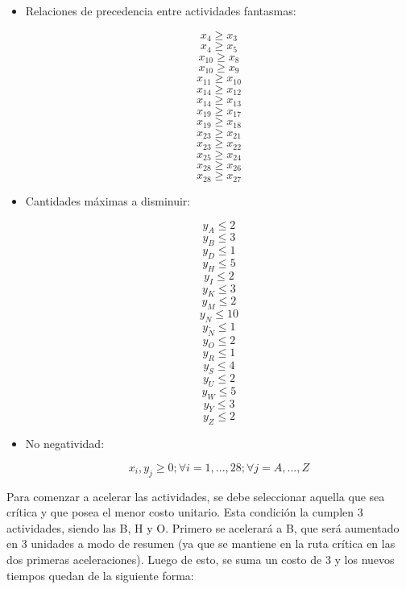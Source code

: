 \documentclass[]{article}
\begin{document}
\begin{itemize}
\begin{itemize}
            \newpage
            \item Relaciones de precedencia entre actividades fantasmas:
                \begin{multicols}{3}
                $$x_4\geq{x_3}$$
                $$x_4\geq{x_5}$$
                $$x_{10}\geq{x_8}$$
                $$x_{10}\geq{x_9}$$
                $$x_{11}\geq{x_{10}}$$
                $$x_{14}\geq{x_{12}}$$
                $$x_{14}\geq{x_{13}}$$
                $$x_{19}\geq{x_{17}}$$
                $$x_{19}\geq{x_{18}}$$
                $$x_{23}\geq{x_{21}}$$
                $$x_{23}\geq{x_{22}}$$
                $$x_{25}\geq{x_{24}}$$
                $$x_{28}\geq{x_{26}}$$
                $$x_{28}\geq{x_{27}}$$
                \end{multicols}
            \item Cantidades máximas a disminuir:
                \begin{multicols}{3}
                $$y_A\leq{2}$$
                $$y_B\leq{3}$$
                $$y_D\leq{1}$$
                $$y_H\leq{5}$$
                $$y_I\leq{2}$$
                $$y_K\leq{3}$$
                $$y_M\leq{2}$$
                $$y_N\leq{10}$$
                $$y_{\tilde{N}}\leq{1}$$
                $$y_O\leq{2}$$
                $$y_R\leq{1}$$
                $$y_S\leq{4}$$
                $$y_U\leq{2}$$
                $$y_W\leq{5}$$
                $$y_Y\leq{3}$$
                $$y_Z\leq{2}$$
                \end{multicols}
            \item No negatividad:
                
                $$x_i,y_j\geq{0};\forall{i}=1,...,28;\forall{j}=A,...,Z$$
                
        \end{itemize}
\end{itemize}

\newpage
Para comenzar a acelerar las actividades, se debe seleccionar aquella que sea crítica y que posea el menor costo unitario. Esta condición la cumplen 3 actividades, siendo las B, H y O. Primero se acelerará a B, que será aumentado en 3 unidades a modo de resumen (ya que se mantiene en la ruta crítica en las dos primeras aceleraciones). Luego de esto, se suma un costo de 3 y los nuevos tiempos quedan de la siguiente forma:
\end{document}

